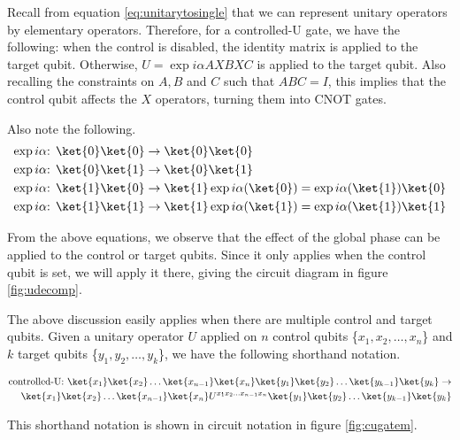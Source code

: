 Recall from equation \ref{eq:unitarytosingle} that we can represent unitary operators by elementary operators. Therefore, for a controlled-U gate, we have the following: when the control is disabled, the identity matrix is applied to the target qubit. Otherwise, $U = \exp{i\alpha}AXBXC$ is applied to the target qubit. Also recalling the constraints on $A,B$ and $C$ such that $ABC = I$, this implies that the control qubit affects the $X$ operators, turning them into \textsc{CNOT} gates. 

Also note the following.
\begin{align}
\exp{i\alpha}\text{: } \ket{0}\ket{0} &\rightarrow \ket{0}\ket{0}\\
\exp{i\alpha}\text{: } \ket{0}\ket{1} &\rightarrow \ket{0}\ket{1}\\
\exp{i\alpha}\text{: } \ket{1}\ket{0} &\rightarrow \ket{1}\exp{i\alpha}(\ket{0}) = \exp{i\alpha}(\ket{1})\ket{0}\\
\exp{i\alpha}\text{: } \ket{1}\ket{1} &\rightarrow \ket{1}\exp{i\alpha}(\ket{1}) = \exp{i\alpha}(\ket{1})\ket{1}
\end{align}

From the above equations, we observe that the effect of the global phase can be applied to the control or target qubits. Since it only applies when the control qubit is set, we will apply it there, giving the circuit diagram in figure \ref{fig:udecomp}.


The above discussion easily applies when there are multiple control and target qubits. Given a unitary operator $U$ applied on $n$ control qubits \{$x_1,x_2,\ldots,x_n$\} and $k$ target qubits \{$y_1,y_2,\dots,y_k$\}, we have the following shorthand notation.

\begin{align}
\text{controlled-U: } \ket{x_1}\ket{x_2}\ldots\ket{x_{n-1}}\ket{x_n}\ket{y_1}\ket{y_2}\ldots\ket{y_{k-1}}\ket{y_k} \rightarrow\\ \ket{x_1}\ket{x_2}\ldots\ket{x_{n-1}}\ket{x_n}U^{x_1x_2\ldots x_{n-1}x_n}\ket{y_1}\ket{y_2}\ldots\ket{y_{k-1}}\ket{y_k}
\end{align}

This shorthand notation is shown in circuit notation in figure \ref{fig:cugatem}.


